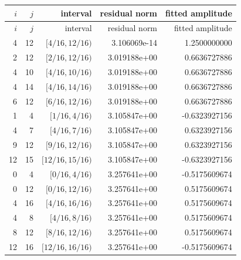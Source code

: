 \begin{longtable}{rrrrr}
\toprule
$i$ & $j$ & interval & residual norm & fitted amplitude\\
\midrule
\endfirsthead
\toprule
$i$ & $j$ & interval & residual norm & fitted amplitude\\
\midrule
\endhead
4 & 12 & $[4/16,12/16)$ & 3.106069e-14 & 1.2500000000\\
2 & 12 & $[2/16,12/16)$ & 3.019188e+00 & 0.6636727886\\
4 & 10 & $[4/16,10/16)$ & 3.019188e+00 & 0.6636727886\\
4 & 14 & $[4/16,14/16)$ & 3.019188e+00 & 0.6636727886\\
6 & 12 & $[6/16,12/16)$ & 3.019188e+00 & 0.6636727886\\
1 & 4 & $[1/16,4/16)$ & 3.105847e+00 & -0.6323927156\\
4 & 7 & $[4/16,7/16)$ & 3.105847e+00 & 0.6323927156\\
9 & 12 & $[9/16,12/16)$ & 3.105847e+00 & 0.6323927156\\
12 & 15 & $[12/16,15/16)$ & 3.105847e+00 & -0.6323927156\\
0 & 4 & $[0/16,4/16)$ & 3.257641e+00 & -0.5175609674\\
0 & 12 & $[0/16,12/16)$ & 3.257641e+00 & 0.5175609674\\
4 & 16 & $[4/16,16/16)$ & 3.257641e+00 & 0.5175609674\\
4 & 8 & $[4/16,8/16)$ & 3.257641e+00 & 0.5175609674\\
8 & 12 & $[8/16,12/16)$ & 3.257641e+00 & 0.5175609674\\
12 & 16 & $[12/16,16/16)$ & 3.257641e+00 & -0.5175609674\\
\bottomrule
\end{longtable}
